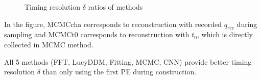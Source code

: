 \begin{figure}[H]
    \centering
    \resizebox{\textwidth}{!}{}
    \caption{\label{fig:deltamethodsdiv} Timing resolution $\delta$ ratios of methods}
\end{figure}

In the figure, $\mathrm{MCMCcha}$ corresponds to reconstruction with recorded $q_{rec}$ during sampling and $\mathrm{MCMCt0}$ corresponds to reconstruction with $t_{0}$, which is directly collected in MCMC method. 

All 5 methods (FFT, LucyDDM, Fitting, MCMC, CNN) provide better timing resolution $\delta$ than only using the first PE during construction. 

